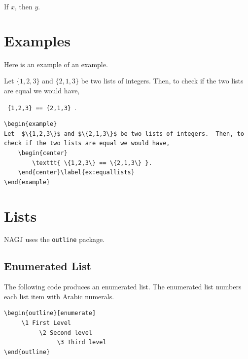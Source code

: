 \begin{corollary}
If $x$, then $y$.
\end{corollary}



\section{Examples}\label{ex:x1}
Here is an example of an example.


\begin{example}
Let  $\{1,2,3\}$ and $\{2,1,3\}$ be two lists of integers.  Then, to check if the two lists are equal we would have,   
	\begin{center}
		\texttt{ \{1,2,3\} == \{2,1,3\} }.
	\end{center}\label{ex:equallists}
\end{example}


\begin{verbatim}
\begin{example}
Let  $\{1,2,3\}$ and $\{2,1,3\}$ be two lists of integers.  Then, to check if the two lists are equal we would have,   
	\begin{center}
		\texttt{ \{1,2,3\} == \{2,1,3\} }.
	\end{center}\label{ex:equallists}
\end{example}
\end{verbatim}



 \section{Lists}
 NAGJ uses the \verb|outline| package.   
  
 \subsection*{Enumerated List}
 The following code produces an enumerated list.  The enumerated list numbers each list item with Arabic numerals.
 
\begin{verbatim}
\begin{outline}[enumerate]
     \1 First Level
          \2 Second level
               \3 Third level
\end{outline}
 \end{verbatim}
 
